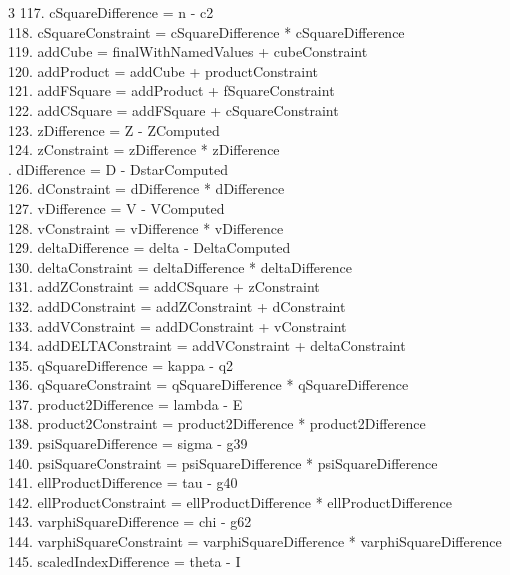 \documentclass[10pt]{article}
\begin{document}
\begin{multicols}{3}
117. cSquareDifference = n - c2\\
118. cSquareConstraint = cSquareDifference * cSquareDifference\\
119. addCube = finalWithNamedValues + cubeConstraint\\
120. addProduct = addCube + productConstraint\\
121. addFSquare = addProduct + fSquareConstraint\\
122. addCSquare = addFSquare + cSquareConstraint\\
123. zDifference = Z - ZComputed\\
124. zConstraint = zDifference * zDifference\\
. dDifference = D - DstarComputed\\
126. dConstraint = dDifference * dDifference\\
127. vDifference = V - VComputed\\
128. vConstraint = vDifference * vDifference\\
129. deltaDifference = delta - DeltaComputed\\
130. deltaConstraint = deltaDifference * deltaDifference\\
131. addZConstraint = addCSquare + zConstraint\\
132. addDConstraint = addZConstraint + dConstraint\\
133. addVConstraint = addDConstraint + vConstraint\\
134. addDELTAConstraint = addVConstraint + deltaConstraint\\
135. qSquareDifference = kappa - q2\\
136. qSquareConstraint = qSquareDifference * qSquareDifference\\
137. product2Difference = lambda - E\\
138. product2Constraint = product2Difference * product2Difference\\
139. psiSquareDifference = sigma - g39\\
140. psiSquareConstraint = psiSquareDifference * psiSquareDifference\\
141. ellProductDifference = tau - g40\\
142. ellProductConstraint = ellProductDifference * ellProductDifference\\
143. varphiSquareDifference = chi - g62\\
144. varphiSquareConstraint = varphiSquareDifference * varphiSquareDifference\\
145. scaledIndexDifference = theta - I\\

\end{multicols}
\end{document}
